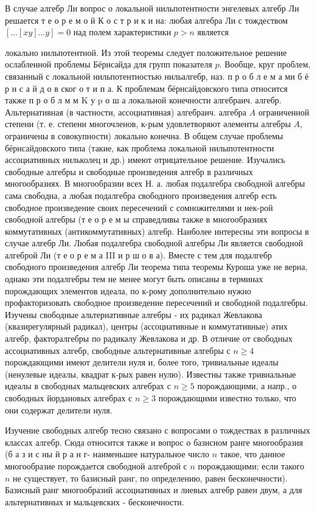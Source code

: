 \documentclass[10pt]{article}
\begin{document}
В случае алгебр Ли вопрос о локальной нильпотентности энгелевых алгебр Ли решается т е о р е м о й К о с т р и к и на: любая алгебра Ли с тождеством $[\ldots[x y] \ldots y]=0$ над полем характеристики $p>n$ является



локально нильпотентной. Из этой теоремы следует положительное решение ослабленной проблемы Бёрнсайда для групп показателя $p$. Вообще, круг проблем, связанный с локальной нильпотентностью нильалгебр, наз. п р о б л е м а ми б ё р н с а й д о в ског о т и п а. К проблемам бёрнсайдовского типа относится также п р о б л м м $\mathrm{K}$ у $\mathrm{p}$ о ш а локальной конечности алгебраич. алгебр. Альтернативная (в частности, ассоциативная) алгебраич. алгебра $A$ ограниченной степени (т. е. степени многочленов, к-рым удовлетворяют әлементы алгебры $A$, ограничены в совокупности) локально конечна. В общем случае проблемы бёрнсайдовского типа (такие, как проблема локальной нилыпотентности ассоциативных нильколец и др.) имеют отрицательное решение. Изучались свободные алгебры и свободные произведения алгебр в различных многообразиях. В многообразии всех Н. а. любая подалгебра свободной алгебры сама свободна, а любая подалгебра свободного произведения алгебр есть свободное произведение своих пересечений с сомножителями и нек-рой свободной алгебры (т е о р е м ы справедливы также в многообразиях коммутативных (антикоммутативных) алгебр. Наиболее интересны эти вопросы в случае алгебр Ли. Любая подалгебра свободной алгебры Ли является свободной алгеброй Ли (т е о р е м а III и р ш о в а). Вместе с тем для подалгебр свободного произведения алгебр Ли теорема типа теоремы Куроша уже не верна, однако эти подалгебры тем не менее могут быть описаны в терминах порождающих элементов идеала, по к-рому дополнительно нужно профакторизовать свободное произведение пересечений и свободной подалгебры. Изучены свободные альтернативные алгебры - их радикал Жевлакова (квазирегулярный радикал), центры (ассоциативные и коммутативные) әтих алгебр, факторалгебры по радикалу Жевлакова и др. В отличие от свободных ассоциативных алгебр, свободные альтернативные алгебры с $n \geqslant 4$ порождающими имеют делители нуля и, более того, тривиальные идеалы (ненулевые идеалы, квадрат к-рых равен нулю). Известны также тривиальные идеалы в свободных мальцевских алгебрах с $n \geqslant 5$ порождающими, а напр., о свободных йордановых алгебрах с $n \geqslant 3$ порождающими известно только, что они содержат делители нуля.



Изучение свободных алгебр тесно связано с вопросами о тождествах в различных классах алгебр. Сюда относится также и вопрос о базисном ранге многообразия (б а з и с ны й р а н г- наименьшее натуральное число $n$ такое, что данное многообразие порождается свободной алгеброй с $n$ порождающими; если такого $n$ не существует, то базисный ранг, по определению, равен бесконечности). Базисный ранг многообразий ассоциативных и лиевых алгебр равен двум, а для альтернативных и мальцевских - бесконечности.
\end{document}
